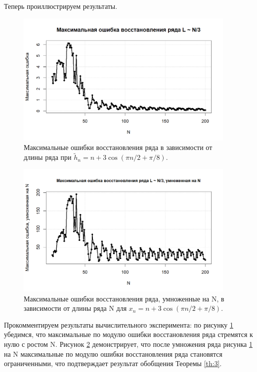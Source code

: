 \documentclass[specialist,
substylefile = spbu_report.rtx,
subf,href,colorlinks=true, 12pt]{disser}
\begin{document}
	Теперь проиллюстрируем результаты.
	\begin{figure}[!h]
		\includegraphics[width=0.95\textwidth]{Pictures/MERNoN.png}
		\caption{Максимальные ошибки восстановления ряда в зависимости от длины ряда при $\widetilde{h}_n = n + 3\cos(\pi n/2 + \pi/8)$.}\label{pic:1}
	\end{figure}
	\begin{figure}[!h]
		\includegraphics[width=0.95\textwidth]{Pictures/MERN.png}
		\caption{Максимальные ошибки восстановления ряда, умноженные на N, в зависимости от длины ряда N для $x_n = n + 3\cos(\pi n/2 + \pi/8)$.}\label{pic:2}
	\end{figure}
	\clearpage
	Прокомментируем результаты вычислительного эксперимента: по рисунку \ref{pic:1} убедимся, что максимальные по модулю ошибки восстановления ряда стремятся к нулю с ростом N. Рисунок \ref{pic:2} демонстрирует, что после умножения ряда рисунка \ref{pic:1} на N максимальные по модулю ошибки восстановления ряда становятся ограниченными, что подтверждает результат обобщения Теоремы \ref{th:3}.
\end{document}
